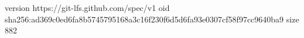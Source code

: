 version https://git-lfs.github.com/spec/v1
oid sha256:ad369c0ed6fa8b5745795168a3c16f230f6d5d6fa93e0307cf58f97cc9640ba9
size 882
